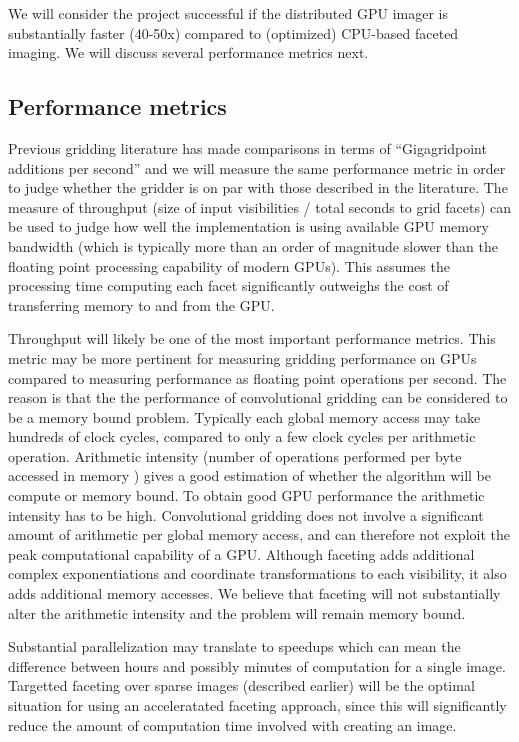 \documentclass[a4paper, two column]{article}
\begin{document}
We will consider the project successful if the distributed GPU imager is substantially faster (40-50x) compared to (optimized) CPU-based faceted imaging. We will discuss several performance metrics next.

\subsection{Performance metrics}
Previous gridding literature \cite{muscat2014high,romein2012efficient} has made comparisons in terms of ``Gigagridpoint additions per second'' and we will measure the same performance metric in order to judge 
whether the gridder is on par with those described in the literature. The measure of throughput (size of input visibilities / total seconds to grid facets) can be used to judge how well the implementation is 
using available GPU memory bandwidth (which is typically more than an order of magnitude slower than the floating point processing capability of modern GPUs). This assumes the processing time computing each 
facet significantly outweighs the cost of transferring memory to and from the GPU.

Throughput will likely be one of the most important performance metrics. This metric may be more pertinent for measuring gridding performance on GPUs compared to measuring performance 
as floating point operations per second. The reason is that the the performance of convolutional gridding can be considered to be a memory bound problem. Typically each global memory access may take hundreds of 
clock cycles, compared to only a few clock cycles per arithmetic operation. Arithmetic intensity (number of operations performed per byte accessed in memory \cite{sclocco2014auto}) gives a good estimation of 
whether the algorithm will be compute or memory bound. To obtain good GPU performance the arithmetic intensity has to be high. Convolutional gridding does not involve a significant amount of arithmetic per 
global memory access, and can therefore not exploit the peak computational capability of a GPU. Although faceting adds additional complex exponentiations and coordinate transformations to each visibility, it 
also adds additional memory accesses. We believe that faceting will not substantially alter the arithmetic intensity and the problem will remain memory bound.

Substantial parallelization may translate to speedups which can mean the difference between hours and possibly minutes of computation for a single image. Targetted faceting over sparse images (described earlier) will
be the optimal situation for using an acceleratated faceting approach, since this will significantly reduce the amount of computation time involved with creating an image. 
\end{document}
